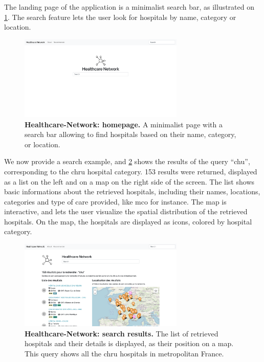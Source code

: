 The landing page of the application is a minimalist search bar, as illustrated on \cref{fig:hn-home}. The search feature lets the user look for hospitals by name, category or location.

\begin{figure}[H]
    \includegraphics[width=0.7\textwidth]{images/healthcare-network/home.png}
    \centering
    \caption{
        \textbf{Healthcare-Network: homepage.} A minimalist page with a search bar allowing to find hospitals based on their name, category, or location.
    }
    \label{fig:hn-home}
\end{figure}

We now provide a search example, and \cref{fig:hn-search} shows the results of the query ``chu'', corresponding to the \acf{chru} hospital category. 153 results were returned, displayed as a list on the left and on a map on the right side of the screen. The list shows basic informations about the retrieved hospitals, including their names, locations, categories and type of care provided, like \acf{mco} for instance. The map is interactive, and lets the user visualize the spatial distribution of the retrieved hospitals. On the map, the hospitals are displayed as icons, colored by hospital category.

\begin{figure}[H]
    \includegraphics[width=0.7\textwidth]{images/healthcare-network/search.png}
    \centering
    \caption{
        \textbf{Healthcare-Network: search results.} The list of retrieved hospitals and their details is displayed, as their position on a map. This query shows all the \ac{chru} hospitals in metropolitan France.
    }
    \label{fig:hn-search}
\end{figure}

